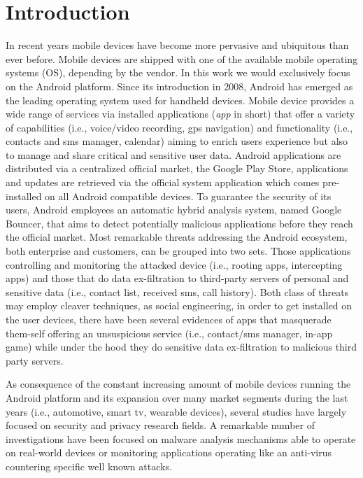 \chapter{Introduction}
\label{introduction}

In recent years mobile devices have become more pervasive and ubiquitous than ever before. Mobile devices are shipped with one of the available mobile operating systems (OS), depending by the vendor. In this work we would exclusively focus on the Android platform. Since its introduction in 2008, Android has emerged as the leading operating system used for handheld devices. Mobile device provides a wide range of services via installed applications (\textit{app} in short) that offer a variety of capabilities (i.e., voice/video recording, gps navigation) and functionality (i.e., contacts and sms manager, calendar) aiming to enrich users experience but also to manage and share critical and sensitive user data.
Android applications are distributed via a centralized official market, the Google Play Store, applications and updates are retrieved via the official system application which comes pre-installed on all Android compatible devices. To guarantee the security of its users, Android employees an automatic hybrid analysis system, named Google Bouncer, that aims to detect potentially malicious applications before they reach the official market. Most remarkable threats addressing the Android ecosystem, both enterprise and customers, can be grouped into two sets. Those applications controlling and monitoring  the attacked device (i.e., rooting apps, intercepting apps) and those that do data ex-filtration to third-party servers of personal and sensitive data (i.e., contact list, received sms, call history). Both class of threats may employ cleaver techniques, as social engineering, in order to get installed on the user devices, there have been several evidences of apps that masquerade them-self offering an unsuspicious service (i.e., contact/sms manager, in-app game) while under the hood they do sensitive data ex-filtration to malicious third party servers.

As consequence of the constant increasing amount of mobile devices running the Android platform and its expansion over many market segments during the last years (i.e., automotive, smart tv, wearable devices), several studies have largely focused on security and privacy research fields.  A remarkable number of investigations have been focused on malware analysis mechanisms able to operate on real-world devices or monitoring applications operating like an anti-virus countering specific well known attacks. 

